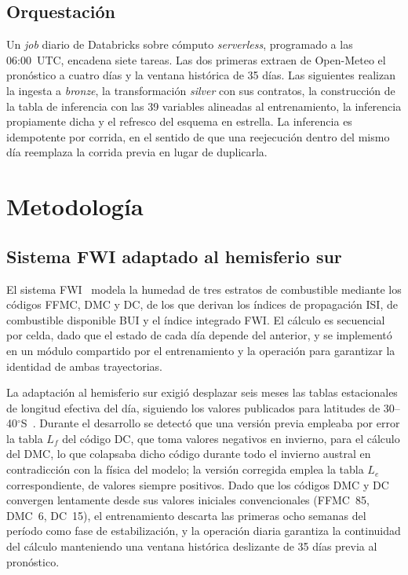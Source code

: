 \documentclass[11pt,a4paper]{article}
\begin{document}
\subsection{Orquestación}

Un \emph{job} diario de Databricks sobre cómputo \emph{serverless},
programado a las 06:00~UTC, encadena siete tareas. Las dos primeras extraen
de Open-Meteo el pronóstico a cuatro días y la ventana histórica de 35
días. Las siguientes realizan la ingesta a \emph{bronze}, la transformación
\emph{silver} con sus contratos, la construcción de la tabla de inferencia
con las 39 variables alineadas al entrenamiento, la inferencia propiamente
dicha y el refresco del esquema en estrella. La inferencia es idempotente
por corrida, en el sentido de que una reejecución dentro del mismo día
reemplaza la corrida previa en lugar de duplicarla.

\section{Metodología}
\label{sec:metodo}

\subsection{Sistema FWI adaptado al hemisferio sur}
\label{sec:fwi}

El sistema FWI~\cite{vanwagner1987} modela la humedad de tres estratos de
combustible mediante los códigos FFMC, DMC y DC, de los que derivan los
índices de propagación ISI, de combustible disponible BUI y el índice
integrado FWI. El cálculo es secuencial por celda, dado que el estado de
cada día depende del anterior, y se implementó en un módulo compartido por
el entrenamiento y la operación para garantizar la identidad de ambas
trayectorias.

La adaptación al hemisferio sur exigió desplazar seis meses las tablas
estacionales de longitud efectiva del día, siguiendo los valores publicados
para latitudes de 30--40$^{\circ}$S~\cite{lawson2008}. Durante el
desarrollo se detectó que una versión previa empleaba por error la tabla
$L_f$ del código DC, que toma valores negativos en invierno, para el
cálculo del DMC, lo que colapsaba dicho código durante todo el invierno
austral en contradicción con la física del modelo; la versión corregida
emplea la tabla $L_e$ correspondiente, de valores siempre positivos. Dado
que los códigos DMC y DC convergen lentamente desde sus valores iniciales
convencionales (FFMC~85, DMC~6, DC~15), el entrenamiento descarta las
primeras ocho semanas del período como fase de estabilización, y la
operación diaria garantiza la continuidad del cálculo manteniendo una
ventana histórica deslizante de 35 días previa al pronóstico.
\end{document}
